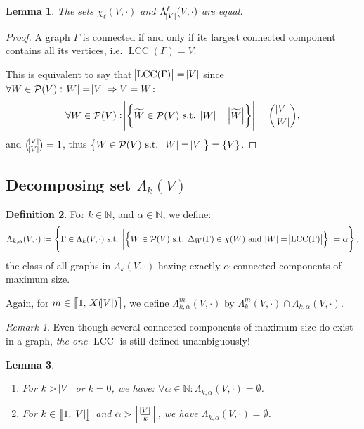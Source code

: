 \documentclass{article}
\newtheorem{lemma}{Lemma}[section]
\theoremstyle{definition}
\newtheorem{definition}[lemma]{Definition}
\theoremstyle{remark}
\newtheorem*{remark}{Remark}
\DeclareMathOperator{\LCC}{LCC}
\newcommand{\N}{\mathbb N}
\newcommand{\intint}[2]{\left\llbracket#1, \, #2\right\rrbracket}
\newcommand{\floor}[1]{\left\lfloor#1\right\rfloor}
\newcommand{\st}{\text{ s.t. }}
\begin{document}
	\begin{lemma} The sets $\chi_\ell(V, \cdot)$ and $\Lambda_{\abs V}^\ell(V, \cdot)$ are equal.
	\end{lemma}

	\begin{proof} A graph $\Gamma$ is connected if and only if its largest connected component contains all its vertices, i.e. $\LCC(\Gamma) = V$.

	This is equivalent to say that $\abs {\LCC(\Gamma)} = \abs V$ since $\forall W \in \mathcal P(V) : \abs W = \abs V \Rightarrow V = W$:
	\[\forall W \in \mathcal P(V) : \abs {\left\{\widetilde W \in \mathcal P(V) \st \abs W = \abs {\widetilde W}\right\}} = \binom {\abs V}{\abs W},\]
	and $\binom {\abs V}{\abs V} = 1$, thus $\left\{W \in \mathcal P(V) \st \abs W = \abs V\right\} = \{V\}$.
	\end{proof}

	\subsection{Decomposing set $\Lambda_k(V)$}
		\begin{definition} For $k \in \N$, and $\alpha \in \N$, we define:
		\[\Lambda_{k,\alpha}(V, \cdot) \coloneqq \left\{\Gamma \in \Lambda_k(V, \cdot) \st
			\abs {\left\{W \in \mathcal P(V) \st \Delta_W(\Gamma) \in \chi(W) \text{ and } \abs W = \abs {\LCC(\Gamma)}\right\}} = \alpha\right\},\]
		the class of all graphs in $\Lambda_k(V, \cdot)$ having exactly $\alpha$ connected components of maximum size.

		Again, for $m \in \intint 1{X(\abs V)}$, we define $\Lambda_{k,\alpha}^m(V, \cdot)$ by $\Lambda_k^m(V, \cdot) \cap \Lambda_{k,\alpha}(V, \cdot)$.
		\end{definition}

		\begin{remark} Even though several connected components of maximum size do exist in a graph, \textit{the one} $\LCC$ is still defined unambiguously!
		\end{remark}

		\begin{lemma}~
		\begin{enumerate}
			\item For $k > \abs V$ or $k=0$, we have: $\forall \alpha \in \N : \Lambda_{k,\alpha}(V, \cdot) = \emptyset$.
			\item For $k \in \intint 1{\abs V}$ and $\alpha > \floor {\frac {\abs V}k}$, we have $\Lambda_{k,\alpha}(V, \cdot) = \emptyset$.
		\end{enumerate}
		\end{lemma}
\end{document}
